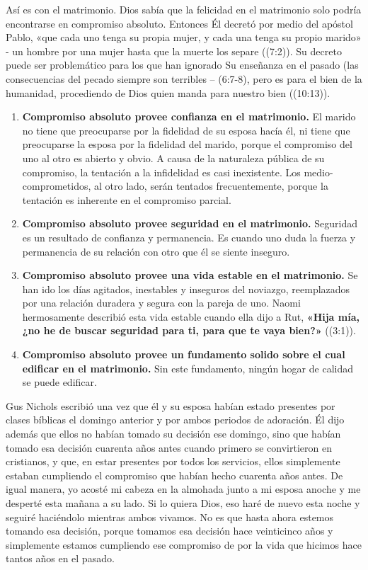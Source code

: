 \documentclass[12pt, twoside, openright]{book}
\begin{document}
Así es con el matrimonio. Dios sabía que la felicidad en el matrimonio solo podría encontrarse en compromiso absoluto. Entonces Él decretó por medio del apóstol Pablo, «que cada uno tenga su propia mujer, y cada una tenga su propio marido» - un hombre por una mujer hasta que la muerte los separe ((7:2)). Su decreto puede ser problemático para los que han ignorado Su enseñanza en el pasado (las consecuencias del pecado siempre son terribles – (6:7-8), pero es para el bien de la humanidad, procediendo de Dios quien manda para nuestro bien ((10:13)).
\begin{enumerate}[labelindent=0pt]
\item\textbf{Compromiso absoluto provee confianza en el matrimonio.} El marido no tiene que preocuparse por la fidelidad de su esposa hacía él, ni tiene que preocuparse la esposa por la fidelidad del marido, porque el compromiso del uno al otro es abierto y obvio. A causa de la naturaleza pública de su compromiso, la tentación a la infidelidad es casi inexistente. Los medio-comprometidos, al otro lado, serán tentados frecuentemente, porque la tentación es inherente en el compromiso parcial.
\item \textbf{Compromiso absoluto provee seguridad en el matrimonio.} Seguridad es un resultado de confianza y permanencia. Es cuando uno duda la fuerza y permanencia de su relación con otro que él se siente inseguro.
\item \textbf{Compromiso absoluto provee una vida estable en el matrimonio.} Se han ido los días agitados, inestables y inseguros del noviazgo, reemplazados por una relación duradera y segura con la pareja de uno. Naomi hermosamente describió esta vida estable cuando ella dijo a Rut, \textbf{«Hija mía, ¿no he de buscar seguridad para ti, para que te vaya bien?»} ((3:1)).
\item \textbf{Compromiso absoluto provee un fundamento solido sobre el cual edificar en el matrimonio.} Sin este fundamento, ningún hogar de calidad se puede edificar. 
\end{enumerate}
Gus Nichols escribió una vez que él y su esposa habían estado presentes por clases bíblicas el domingo anterior y por ambos periodos de adoración. Él dijo además que ellos no habían tomado su decisión ese domingo, sino que habían tomado esa decisión cuarenta años antes cuando primero se convirtieron en cristianos, y que, en estar presentes por todos los servicios, ellos simplemente estaban cumpliendo el compromiso que habían hecho cuarenta años antes. De igual manera, yo acosté mi cabeza en la almohada junto a mi esposa anoche y me desperté esta mañana a su lado. Si lo quiera Dios, eso haré de nuevo esta noche y seguiré haciéndolo mientras ambos vivamos. No es que hasta ahora estemos tomando esa decisión, porque tomamos esa decisión hace veinticinco años y simplemente estamos cumpliendo ese compromiso de por la vida que hicimos hace tantos años en el pasado.
\end{document}

